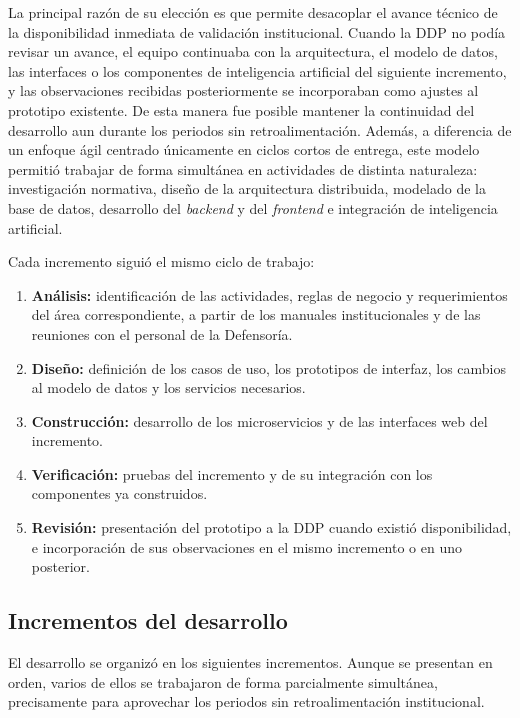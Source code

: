 La principal razón de su elección es que permite desacoplar el avance técnico de la disponibilidad inmediata de validación institucional. Cuando la DDP no podía revisar un avance, el equipo continuaba con la arquitectura, el modelo de datos, las interfaces o los componentes de inteligencia artificial del siguiente incremento, y las observaciones recibidas posteriormente se incorporaban como ajustes al prototipo existente. De esta manera fue posible mantener la continuidad del desarrollo aun durante los periodos sin retroalimentación. Además, a diferencia de un enfoque ágil centrado únicamente en ciclos cortos de entrega, este modelo permitió trabajar de forma simultánea en actividades de distinta naturaleza: investigación normativa, diseño de la arquitectura distribuida, modelado de la base de datos, desarrollo del \textit{backend} y del \textit{frontend} e integración de inteligencia artificial.

Cada incremento siguió el mismo ciclo de trabajo:

\begin{enumerate}
    \item \textbf{Análisis:} identificación de las actividades, reglas de negocio y requerimientos del área correspondiente, a partir de los manuales institucionales y de las reuniones con el personal de la Defensoría.
    \item \textbf{Diseño:} definición de los casos de uso, los prototipos de interfaz, los cambios al modelo de datos y los servicios necesarios.
    \item \textbf{Construcción:} desarrollo de los microservicios y de las interfaces web del incremento.
    \item \textbf{Verificación:} pruebas del incremento y de su integración con los componentes ya construidos.
    \item \textbf{Revisión:} presentación del prototipo a la DDP cuando existió disponibilidad, e incorporación de sus observaciones en el mismo incremento o en uno posterior.
\end{enumerate}

\subsection{Incrementos del desarrollo}
El desarrollo se organizó en los siguientes incrementos. Aunque se presentan en orden, varios de ellos se trabajaron de forma parcialmente simultánea, precisamente para aprovechar los periodos sin retroalimentación institucional.

